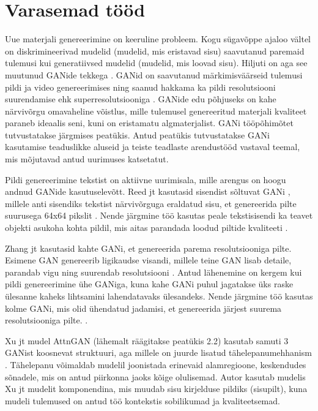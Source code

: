 \documentclass{vilgym}
\begin{document}
	\section{Varasemad tööd}

	Uue materjali genereerimine on keeruline probleem. Kogu sügavõppe ajaloo vältel on diskrimineerivad mudelid (mudelid, mis eristavad sisu) saavutanud paremaid tulemusi kui generatiivsed mudelid (mudelid, mis loovad sisu). Hiljuti on aga see muutunud GANide tekkega \parencite{gan}. GANid on saavutanud märkimisväärseid tulemusi pildi \parencite{biggan} ja video genereerimises \parencite{dvdgan} ning saanud hakkama ka pildi resolutsiooni suurendamise ehk superresolutsiooniga \parencite{srgan}. GANide edu põhjuseks on kahe närvivõrgu omavaheline võistlus, mille tulemusel genereeritud materjali kvaliteet paraneb ideaalis seni, kuni on eristamatu algmaterjalist. GANi tööpõhimõtet tutvustatakse järgmises peatükis. Antud peatükis tutvustatakse GANi kasutamise teaduslikke aluseid ja teiste teadlaste arendustööd vastaval teemal, mis mõjutavad antud uurimuses katsetatut. 

	Pildi genereerimine tekstist on aktiivne uurimisala, mille arengus on hoogu andnud GANide kasutuselevõtt. Reed jt kasutasid sisendist sõltuvat GANi , millele anti sisendiks tekstist närvivõrguga eraldatud sisu, et genereerida pilte suurusega 64x64 pikslit \parencite{reed}. Nende järgmine töö kasutas peale tekstisisendi ka teavet objekti asukoha kohta pildil, mis aitas parandada loodud piltide kvaliteeti \parencite{reed2}. 

	Zhang jt kasutasid kahte GANi, et genereerida parema resolutsiooniga pilte. Esimene GAN genereerib ligikaudse visandi, millele teine GAN lisab detaile, parandab vigu ning suurendab resolutsiooni \parencite{stackgan}. Antud lähenemine on kergem kui pildi genereerimine ühe GANiga, kuna kahe GANi puhul jagatakse üks raske ülesanne kaheks lihtsamini lahendatavaks ülesandeks. Nende järgmine töö kasutas kolme GANi, mis olid ühendatud jadamisi, et genereerida järjest suurema resolutsiooniga pilte. \parencite{stackgan2}.

	Xu jt mudel AttnGAN (lähemalt räägitakse peatükis 2.2) kasutab samuti 3 GANist koosnevat struktuuri, aga millele on juurde lisatud tähelepanumehhanism  \parencite{attngan}. Tähelepanu võimaldab mudelil joonistada erinevaid alamregioone, keskendudes sõnadele, mis on antud piirkonna jaoks kõige olulisemad. Autor kasutab mudelis Xu jt mudelit komponendina, mis muudab sisu kirjelduse pildiks (sisu\textrightarrow pilt), kuna mudeli tulemused on antud töö kontekstis sobilikumad ja kvaliteetsemad.
\end{document}
